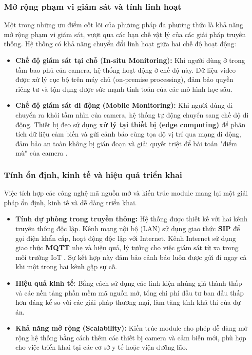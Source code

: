 \subsubsection{Mở rộng phạm vi giám sát và tính linh hoạt}
Một trong những ưu điểm cốt lõi của phương pháp đa phương thức là khả năng mở rộng phạm vi giám sát, vượt qua các hạn chế vật lý của các giải pháp truyền thống. Hệ thống có khả năng chuyển đổi linh hoạt giữa hai chế độ hoạt động:

\begin{itemize}
    \item \textbf{Chế độ giám sát tại chỗ (In-situ Monitoring):} Khi người dùng ở trong tầm bao phủ của camera, hệ thống hoạt động ở chế độ này. Dữ liệu video được xử lý cục bộ trên máy chủ (on-premise processing), đảm bảo quyền riêng tư và tận dụng được sức mạnh tính toán của các mô hình học sâu.
    \item \textbf{Chế độ giám sát di động (Mobile Monitoring):} Khi người dùng di chuyển ra khỏi tầm nhìn của camera, hệ thống tự động chuyển sang chế độ di động. Thiết bị đeo sử dụng \textbf{xử lý tại thiết bị (edge computing)} để phân tích dữ liệu cảm biến và gửi cảnh báo cùng tọa độ vị trí qua mạng di động, đảm bảo an toàn không bị gián đoạn và giải quyết triệt để bài toán "điểm mù" của camera \cite{researchgate_edge_computing}.
\end{itemize}

\subsubsection{Tính ổn định, kinh tế và hiệu quả triển khai}
Việc tích hợp các công nghệ mã nguồn mở và kiến trúc module mang lại một giải pháp ổn định, kinh tế và dễ dàng triển khai.

\begin{itemize}
    \item \textbf{Tính dự phòng trong truyền thông:} Hệ thống được thiết kế với hai kênh truyền thông độc lập. Kênh mạng nội bộ (LAN) sử dụng giao thức \textbf{SIP} để gọi điện khẩn cấp, hoạt động độc lập với Internet. Kênh Internet sử dụng giao thức \textbf{MQTT} nhẹ và hiệu quả, lý tưởng cho việc giám sát từ xa trong môi trường IoT \cite{parangat_mqtt}. Sự kết hợp này đảm bảo cảnh báo luôn được gửi đi ngay cả khi một trong hai kênh gặp sự cố.
    \item \textbf{Hiệu quả kinh tế:} Bằng cách sử dụng các linh kiện nhúng giá thành thấp và các nền tảng phần mềm mã nguồn mở, tổng chi phí đầu tư ban đầu thấp hơn đáng kể so với các giải pháp thương mại, làm tăng tính khả thi của dự án.
    \item \textbf{Khả năng mở rộng (Scalability):} Kiến trúc module cho phép dễ dàng mở rộng hệ thống bằng cách thêm các thiết bị camera và cảm biến mới, phù hợp cho việc triển khai tại các cơ sở y tế hoặc viện dưỡng lão.
\end{itemize}

